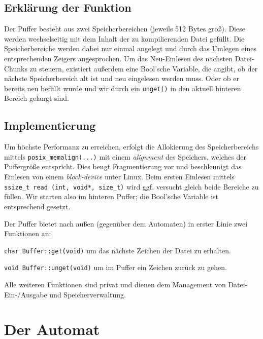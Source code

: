 \documentclass[
a4paper,   %
11pt,      %
oneside,   %
onecolumn, %
final      %
]{article}
\newcommand{\code}[1]{\lstinline$#1$}
\begin{document}
\subsection{Erklärung der Funktion}
Der Puffer besteht aus zwei Speicherbereichen (jeweils 512 Bytes groß).
Diese werden wechselseitig mit dem Inhalt der zu kompilierenden Datei gefüllt.
Die Speicherbereiche werden dabei nur einmal angelegt und durch das Umlegen eines entsprechenden Zeigers angesprochen.
Um das Neu-Einlesen des nächsten Datei-Chunks zu steuern, existiert außerdem eine Bool'sche Variable, die angibt, ob der nächste Speicherbereich alt ist und neu eingelesen werden muss.
Oder ob er bereits neu befüllt wurde und wir durch ein \code{unget()} in den aktuell hinteren Bereich gelangt sind.

\subsection{Implementierung}
Um höchste Performanz zu erreichen, erfolgt die Allokierung des Speicherbereichs mittels \code{posix_memalign(...)} mit einem \emph{alignment} des Speichers, welches der Puffergröße entspricht.
Dies beugt Fragmentierung vor und beschleunigt das Einlesen von einem \emph{block-device} unter Linux.
Beim ersten Einlesen mittels \code{ssize_t read (int, void*, size_t)} wird ggf. versucht gleich beide Bereiche zu füllen. Wir starten also im hinteren Puffer; die Bool'sche Variable ist entsprechend gesetzt.

Der Puffer bietet nach außen (gegenüber dem Automaten) in erster Linie zwei Funktionen an:
\begin{description}
\item \code{char Buffer::get(void)} um das nächste Zeichen der Datei zu erhalten.
\item \code{void Buffer::unget(void)} um im Puffer ein Zeichen zurück zu gehen.
\end{description}
Alle weiteren Funktionen sind privat und dienen dem Management von Datei-Ein-/Ausgabe und Speicherverwaltung.

\section{Der Automat}
\end{document}
